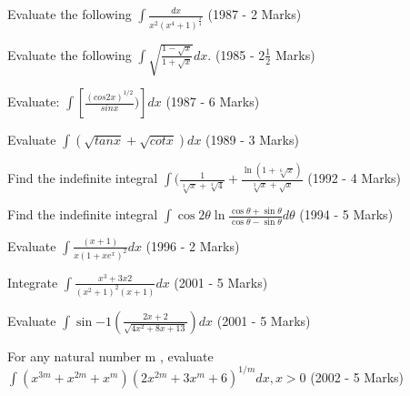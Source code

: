 \iffalse
\title{Assignment}
\author{K.AKSHAY TEJA}
\section{subjective}
\fi
    
\item   Evaluate the following $\int\frac{dx}{x^2(x^4 +1)^\frac{3}{4}} $ 
         \hfill  (1987 - 2 Marks)
\item   Evaluate the following $\int \sqrt{\frac{1 - \sqrt{x}}{1 + \sqrt{x}}}   dx$.\hfill
  (1985 - 2$\frac{1}{2}$ Marks)  


\item Evaluate: $\int$$[\frac{(cos2x)^{1/2}}{sin x})]dx$ \hfill  (1987 - 6 Marks)

\item   Evaluate {$\int(\sqrt{tan x}+\sqrt{cot x})dx$}      
  \hfill
(1989 - 3 Marks)
 

\item  Find the indefinite integral $\int$$(\frac{1}{\sqrt[3]{x} + \sqrt[4]{4}}+\frac{\ln (1+\sqrt[6]{x})}{\sqrt[3]{x}+\sqrt{x}}$  \hfill   (1992 - 4 Marks)

\item Find the indefinite integral \(\int \cos 2\theta \ln \frac{\cos \theta + \sin \theta}{\cos \theta - \sin \theta}   d\theta\) \hfill  (1994 - 5 Marks)


\item  Evaluate $\int\frac{(x + 1)}{x(1 + xe^x)^2}dx$  \hfill (1996 - 2 Marks)

\item Integrate $\int\frac{x^{3}+3x 2}{(x^{2}+ 1)^{2}(x + 1)}dx$ \hfill  (2001 - 5 Marks)

\item   Evaluate $\int \sin{-1} (\frac{2x + 2}{\sqrt{4x^{2}+8x+13}})dx$    \hfill    (2001 - 5 Marks)

\item  For any natural number m , evaluate ${\int(x^{3m} + x^{2m}+x^{m})(2x^{2m}+3x^{m}+6)^{1/m}dx,x>0}$   \hfill   (2002 - 5 Marks)
 

              

